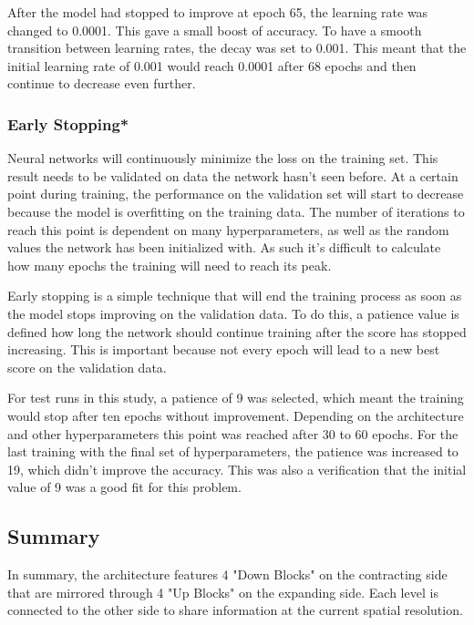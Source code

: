 After the model had stopped to improve at epoch 65, the learning rate was changed to 0.0001. This gave a small boost of accuracy. To have a smooth transition between learning rates, the decay was set to 0.001. This meant that the initial learning rate of 0.001 would reach 0.0001 after 68 epochs and then continue to decrease even further.

\subsubsection{Early Stopping*}

Neural networks will continuously minimize the loss on the training set. This result needs to be validated on data the network hasn't seen before. At a certain point during training, the performance on the validation set will start to decrease because the model is overfitting on the training data. The number of iterations to reach this point is dependent on many hyperparameters, as well as the random values the network has been initialized with. As such it's difficult to calculate how many epochs the training will need to reach its peak.

Early stopping is a simple technique that will end the training process as soon as the model stops improving on the validation data. To do this, a patience value is defined how long the network should continue training after the score has stopped increasing. This is important because not every epoch will lead to a new best score on the validation data.

For test runs in this study, a patience of 9 was selected, which meant the training would stop after ten epochs without improvement. Depending on the architecture and other hyperparameters this point was reached after 30 to 60 epochs. For the last training with the final set of hyperparameters, the patience was increased to 19, which didn't improve the accuracy.  This was also a verification that the initial value of 9 was a good fit for this problem.

\subsection{Summary}

In summary, the architecture features 4 "Down Blocks" on the contracting side that are mirrored through 4 "Up Blocks" on the expanding side. Each level is connected to the other side to share information at the current spatial resolution.

